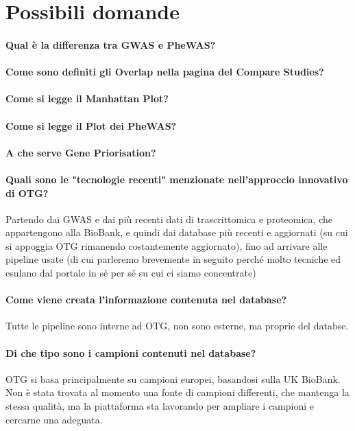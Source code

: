 \documentclass{article}
\begin{document}
\section{Possibili domande}
\paragraph{Qual è la differenza tra GWAS e PheWAS?}
\paragraph{Come sono definiti gli Overlap nella pagina del Compare Studies?}
\paragraph{Come si legge il Manhattan Plot?}
\paragraph{Come si legge il Plot dei PheWAS?}
\paragraph{A che serve Gene Priorisation?}
\paragraph{Quali sono le "tecnologie recenti" menzionate nell'approccio innovativo di OTG?}
Partendo dai GWAS e dai più recenti dati di trascrittomica e proteomica, che appartengono alla BioBank, e quindi dai database più recenti e aggiornati (su cui si appoggia OTG rimanendo costantemente aggiornato), fino ad arrivare alle pipeline usate (di cui parleremo brevemente in seguito perché molto tecniche ed esulano dal portale in sé per sé su cui ci siamo concentrate)
\paragraph{Come viene creata l’informazione contenuta nel database?}
Tutte le pipeline sono interne ad OTG, non sono esterne, ma proprie del databse.
\paragraph{Di che tipo sono i campioni contenuti nel database?}
OTG si basa principalmente su campioni europei, basandosi sulla UK BioBank. Non è stata trovata al momento una fonte di campioni differenti, che mantenga la stessa qualità, ma la piattaforma sta lavorando per ampliare i campioni e cercarne una adeguata.
\end{document}
